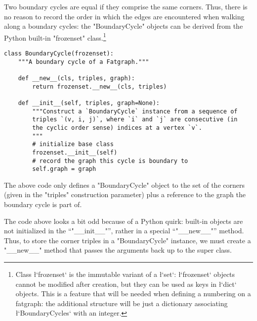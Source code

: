Two boundary cycles are equal if they comprise the same corners.
Thus, there is no reason to record the order in which the edges are
encountered when walking along a boundary cycles: the
"BoundaryCycle" objects can be derived from the Python built-in
"frozenset" class.\footnote{Class \protect\l`frozenset` is the
  immutable variant of a \protect\l`set`: \protect\l`frozenset`
  objects cannot be modified after creation, but they can be used as
  keys in \protect\l`dict` objects.  This is a feature that will be
  needed when defining a numbering on a fatgraph: the additional
  structure will be just a dictionary associating
  \protect\l`BoundaryCycles` with an integer.}
\begin{lstlisting}
class BoundaryCycle(frozenset):
    """A boundary cycle of a Fatgraph."""

    def __new__(cls, triples, graph):
        return frozenset.__new__(cls, triples)

    def __init__(self, triples, graph=None):
        """Construct a `BoundaryCycle` instance from a sequence of
        triples `(v, i, j)`, where `i` and `j` are consecutive (in
        the cyclic order sense) indices at a vertex `v`.
        """
        # initialize base class
        frozenset.__init__(self)
        # record the graph this cycle is boundary to
        self.graph = graph 

\end{lstlisting}
The above code only defines a "BoundaryCycle" object to the set of
the corners (given in the "triples" construction parameter) plus a
reference to the graph the boundary cycle is part of.

The code above looks a bit odd because of a Python quirk: built-in
objects are not initialized in the ``"__init__"'', rather in a
special ``"__new__"'' method. Thus, to store the corner triples in a
"BoundaryCycle" instance, we must create a "__new__" method that
passes the arguments back up to the super class.

